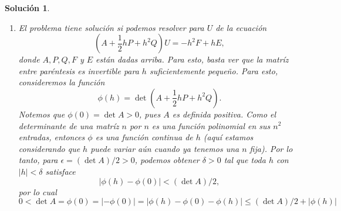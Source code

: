 \documentclass[11pt]{article}
\newtheorem*{sol}{Solución}
\begin{document}
\begin{sol}
\begin{enumerate}
\begin{align}
        \\
        &=
          \left(
            u''(x_i)
            + \frac{h^{2}}{12}N
            + O(h^{3})
          \right)
        - p_i
          \left(
            u'(x_i)
            + \frac{h^{2}}{6}M
            + O(h^{3})
          \right)
        - q_i
        u(x_i)
        \\
        &=
          \left( u''(x_i) - p_i u'(x_i) - q_i u(x_i) \right)
          + \frac{h^{2}}{12}N
          - p_i \frac{h^{2}}{6}M
            + O(h^{3})
        \\
        &=
          f_i
          +
          \left( \frac{N}{2} - p_i M \right)
          \frac{h^{2}}{6}
            + O(h^{3})
      .\end{align}
      Así,
      \begin{equation}
        \tau_i(h)
        =
        \left( \frac{N}{2} - p_i M \right)
        \frac{h^{2}}{6}
        + O(h^{3})
      ,\end{equation}
      con lo cual el método es consistente de orden $2$.
    \item
      El problema tiene solución si podemos resolver para $U$ de la
      ecuación
      \begin{equation}
        \left(A + \frac{1}{2}hP + h^{2}Q\right)U = -h^{2}F + hE
      ,\end{equation}
      donde $A,P,Q,F$ y $E$ están dadas arriba.
      Para esto, basta ver que la matríz entre paréntesis es
      invertible para $h$ suficientemente pequeño.
      Para esto, consideremos la función
      \begin{equation}
        \phi(h) = \det \left(A + \frac{1}{2}hP + h^{2}Q\right)
      .\end{equation}
      Notemos que $\phi(0)=\det A >0$, pues $A$ es definida positiva.
      Como el determinante de una matríz $n$ por $n$ es una función
      polinomial en sus $n^{2}$ entradas, entonces $\phi$ es una
      función continua de $h$ (aquí estamos considerando que $h$ puede
      variar aún cuando ya tenemos una $n$ fija).
      Por lo tanto, para $\epsilon=(\det A) / 2>0$, podemos obtener
      $\delta>0$ tal que toda $h$ con $|h|<\delta$ satisface
      \begin{equation}
        |\phi(h)-\phi(0)|<(\det A) / 2
      ,\end{equation}
      por lo cual
      \begin{equation}
        0 < \det A = \phi(0) = |-\phi(0)| = 
        |\phi(h) - \phi(0) - \phi(h)|
        \leq (\det A) / 2 + |\phi(h)|

\end{equation}
\end{enumerate}
\end{sol}
\end{document}
